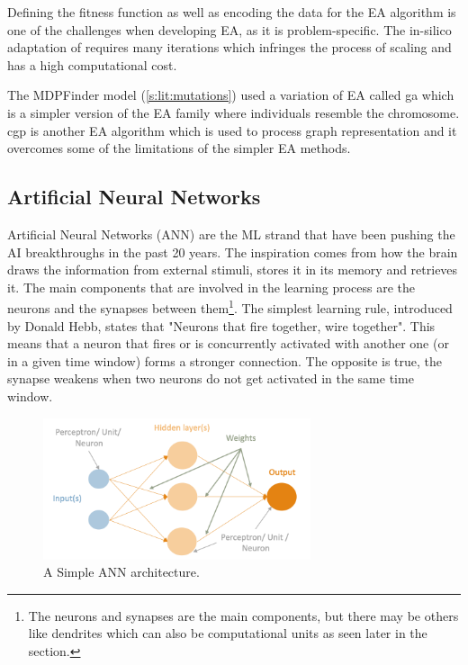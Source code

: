 Defining the fitness function as well as encoding the data for the EA algorithm is one of the challenges when developing EA, as it is problem-specific. The in-silico adaptation of  requires many iterations which infringes the process of scaling and has a high computational cost.

The MDPFinder model (\cref{s:lit:mutations}) used a variation of EA called \acrfull{ga} which is a simpler version of the EA family where individuals resemble the chromosome. \acrfull{cgp} is another EA algorithm which is used to process graph representation and it overcomes some of the limitations of the simpler EA methods. 


\subsection{Artificial Neural Networks} \label{s:lit:ann_overview}

Artificial Neural Networks (ANN) are the ML strand that have been pushing the AI breakthroughs in the past 20 years. The inspiration comes from how the brain draws the information from external stimuli, stores it in its memory and retrieves it. The main components that are involved in the learning process are the neurons and the synapses between them\footnote{The neurons and synapses are the main components, but there may be others like dendrites which can also be computational units as seen later in the section.}. The simplest learning rule, introduced by Donald Hebb, states that "Neurons that fire together, wire together"\cite{Hebb_Donald1949-nn}. This means that a neuron that fires or is concurrently activated with another one (or in a given time window) forms a stronger connection. The opposite is true, the synapse weakens when two neurons do not get activated in the same time window. 

\begin{figure}[!htb]
  \centering\includegraphics[width=0.7\textwidth,height=0.7\textheight,keepaspectratio]{Sections/Lit_review/Resources/Basic_ANN.png}
    \caption{A Simple ANN architecture. }
    \label{fig:ann_basic}
\end{figure}
\FloatBarrier

